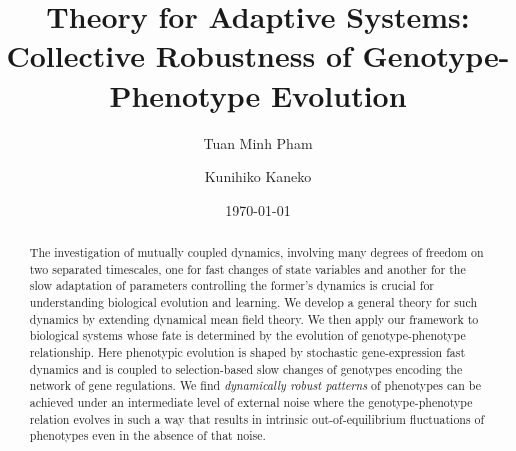 \documentclass[%
 reprint,
superscriptaddress,
 amsmath,amssymb,
 prl,
]{revtex4-2}
\begin{document}

\title{Theory for Adaptive Systems: Collective Robustness of Genotype-Phenotype Evolution}

\author{Tuan Minh Pham}



\author{Kunihiko Kaneko}
\date{\today}%

\begin{abstract}
 The investigation of mutually coupled dynamics, involving many degrees of freedom on two separated  timescales, one for fast changes of state variables  and another for the slow adaptation of  parameters controlling  the former's dynamics is crucial for understanding biological evolution and learning.  We develop a general theory for such dynamics by extending  dynamical mean field theory. We then apply our  framework  to biological systems whose fate is determined by
the evolution of 
genotype-phenotype relationship. %
Here %
phenotypic evolution is shaped by stochastic gene-expression fast dynamics and is coupled to  selection-based slow changes of genotypes encoding the network of gene regulations. We find   \emph{dynamically robust patterns} of phenotypes can be achieved  under an intermediate level of external noise  where  the genotype-phenotype relation evolves in such a way that results in intrinsic out-of-equilibrium fluctuations of phenotypes even in the absence of that noise. %

\end{abstract}
\end{document}
